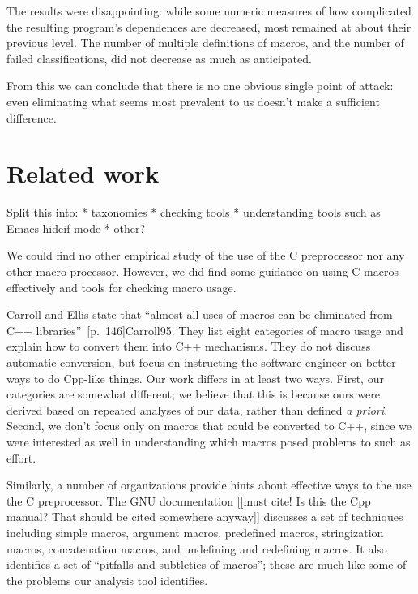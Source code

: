 \documentclass[10pt]{article}
\begin{document}
    The results were disappointing:  while some numeric measures of how
      complicated the resulting program's dependences are decreased, most
      remained at about their previous level.  The number of multiple
      definitions of macros, and the number of failed classifications, did
      not decrease as much as anticipated.

    From this we can conclude that there is no one obvious single point of
      attack:  even eliminating what seems most prevalent to us doesn't
      make a sufficient difference.



\section{Related work}
\label{sec:related}

Split this into:
 * taxonomies
 * checking tools
 * understanding tools such as Emacs hideif mode
 * other?

We could find no other empirical study of the use of the C
preprocessor nor any other macro processor.  However, we did find some
guidance on using C macros effectively and tools for checking macro
usage.

Carroll and Ellis state that ``almost all uses of macros can be eliminated
from C++ libraries''~[p.~146]{Carroll95}.  They list eight categories
of macro usage and explain how to convert them into C++ mechanisms.  They
do not discuss automatic conversion, but focus on instructing the software
engineer on better ways to do Cpp-like things.  Our work differs in at
least two ways.  First, our categories are somewhat different; we
believe that this is because ours were derived based on repeated
analyses of our data, rather than defined {\em a priori\/}.  Second,
we don't focus only on macros that could be converted to C++, since we
were interested as well in understanding which macros posed problems
to such as effort.

Similarly, a number of organizations provide hints about effective
ways to the use the C preprocessor.  The GNU documentation [[must
cite!  Is this the Cpp manual?  That should be cited somewhere
anyway]] discusses a set of techniques including simple macros,
argument macros, predefined macros, stringization macros,
concatenation macros, and undefining and redefining macros.  It also
identifies a set of ``pitfalls and subtleties of macros''; these are
much like some of the problems our analysis tool identifies.
\end{document}
